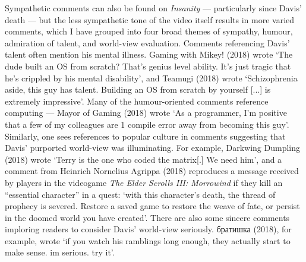 \documentclass[Draft.tex]{subfiles}
\begin{document}

Sympathetic comments can also be found on \textit{Insanity} --- particularly
since Davis' death --- but the less sympathetic tone of the video itself
results in more varied comments,
which I have grouped into four broad themes of sympathy, humour,
admiration of talent, and world-view evaluation.
Comments referencing Davis' talent often mention his mental illness.
Gaming with Mikey! (2018) wrote `The dude built an OS from scratch?
That's genius level ability. It's just tragic that he's crippled by his
mental disability', and
Teamugi (2018) wrote `Schizophrenia aside, this guy has talent.
Building an OS from scratch by yourself [...] is extremely impressive'.
Many of the humour-oriented comments reference computing ---
Mayor of Gaming (2018) wrote `As a programmer, I'm positive that
a few of my colleagues are 1 compile error away from becoming this guy'.
Similarly, one sees references to popular culture in comments suggesting
that Davis' purported world-view was illuminating.
For example, Darkwing Dumpling (2018) wrote
`Terry is the one who coded the matrix[.] We need him',
and a comment from Heinrich Nornelius Agrippa (2018)
reproduces a message received by players in the videogame
\textit{The Elder Scrolls III: Morrowind} if they kill an
``essential character'' in a quest:
`with this character's death,
the thread of prophecy is severed.
Restore a saved game to restore the weave of fate,
or persist in the doomed world you have created'.
There are also some sincere comments imploring readers to
consider Davis' world-view seriously.
\foreignlanguage{russian}{братишка} (2018), for example, wrote
`if you watch his ramblings long enough,
they actually start to make sense. im serious. try it'.
\end{document}
